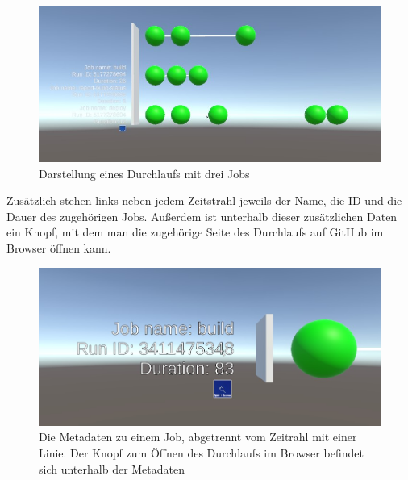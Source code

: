 \documentclass[a4paper]{article}
\begin{document}
\begin{figure}[H]
    \centering
    \includegraphics[width=.8\textwidth]{img/Timeline3Jobs.jpg}
    \caption{Darstellung eines Durchlaufs mit drei Jobs}
    \label{fig:DreiJobs}
\end{figure}

Zusätzlich stehen links neben jedem Zeitstrahl jeweils der Name, die ID und die Dauer des zugehörigen Jobs. Außerdem ist unterhalb dieser zusätzlichen Daten ein Knopf, mit dem man die zugehörige Seite des Durchlaufs auf GitHub im Browser öffnen kann.

\begin{figure}[H]
    \centering
    \includegraphics[width=.8\textwidth]{img/Metadaten.jpg}
    \caption{Die Metadaten zu einem Job, abgetrennt vom Zeitrahl mit einer Linie. Der Knopf zum Öffnen des Durchlaufs im Browser befindet sich unterhalb der Metadaten}
    \label{fig:Metadaten}
\end{figure}
\end{document}
